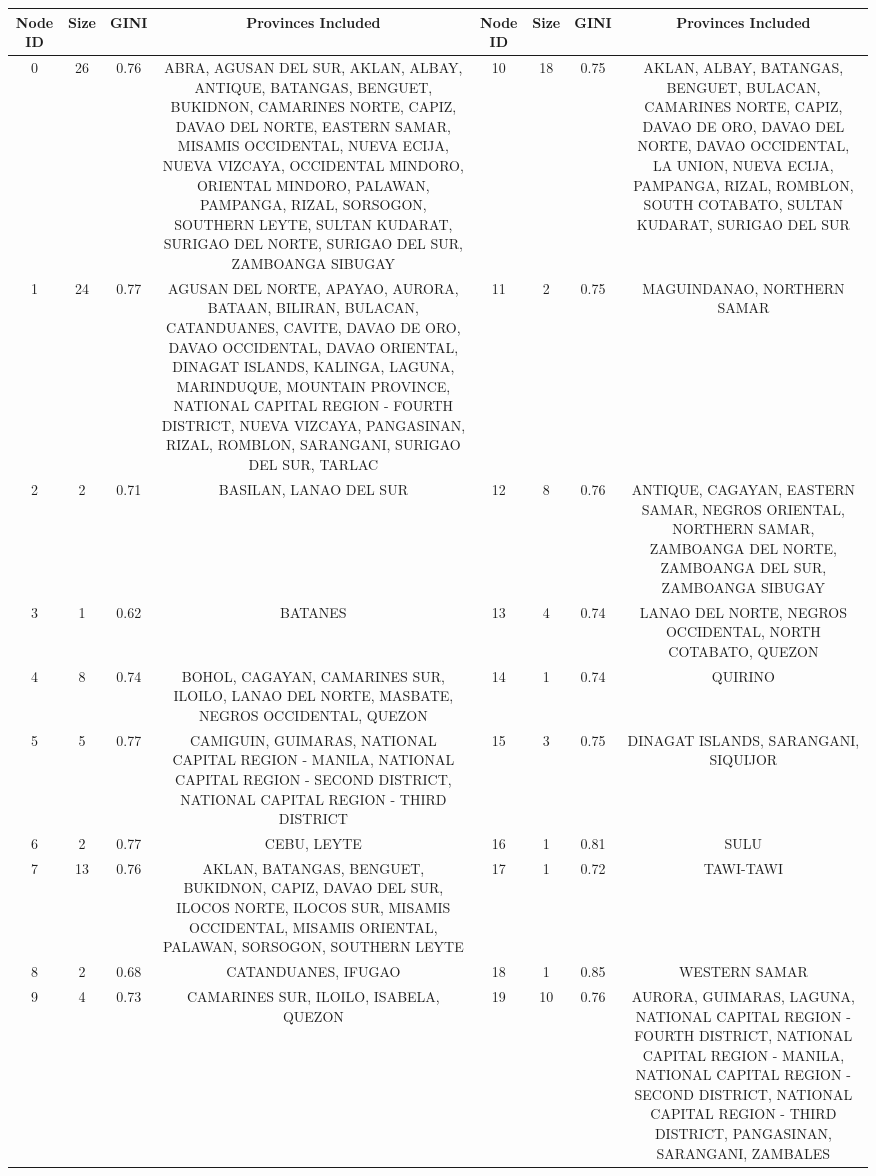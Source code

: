 \begin{tabular}{cccc|cccc}
\toprule
Node ID & Size & GINI & Provinces Included & Node ID & Size & GINI & Provinces Included \\
\midrule
0 & 26 & 0.76 & ABRA, AGUSAN DEL SUR, AKLAN, ALBAY, ANTIQUE, BATANGAS, BENGUET, BUKIDNON, CAMARINES NORTE, CAPIZ, DAVAO DEL NORTE, EASTERN SAMAR, MISAMIS OCCIDENTAL, NUEVA ECIJA, NUEVA VIZCAYA, OCCIDENTAL MINDORO, ORIENTAL MINDORO, PALAWAN, PAMPANGA, RIZAL, SORSOGON, SOUTHERN LEYTE, SULTAN KUDARAT, SURIGAO DEL NORTE, SURIGAO DEL SUR, ZAMBOANGA SIBUGAY & 10 & 18 & 0.75 & AKLAN, ALBAY, BATANGAS, BENGUET, BULACAN, CAMARINES NORTE, CAPIZ, DAVAO DE ORO, DAVAO DEL NORTE, DAVAO OCCIDENTAL, LA UNION, NUEVA ECIJA, PAMPANGA, RIZAL, ROMBLON, SOUTH COTABATO, SULTAN KUDARAT, SURIGAO DEL SUR \\
1 & 24 & 0.77 & AGUSAN DEL NORTE, APAYAO, AURORA, BATAAN, BILIRAN, BULACAN, CATANDUANES, CAVITE, DAVAO DE ORO, DAVAO OCCIDENTAL, DAVAO ORIENTAL, DINAGAT ISLANDS, KALINGA, LAGUNA, MARINDUQUE, MOUNTAIN PROVINCE, NATIONAL CAPITAL REGION - FOURTH DISTRICT, NUEVA VIZCAYA, PANGASINAN, RIZAL, ROMBLON, SARANGANI, SURIGAO DEL SUR, TARLAC & 11 & 2 & 0.75 & MAGUINDANAO, NORTHERN SAMAR \\
2 & 2 & 0.71 & BASILAN, LANAO DEL SUR & 12 & 8 & 0.76 & ANTIQUE, CAGAYAN, EASTERN SAMAR, NEGROS ORIENTAL, NORTHERN SAMAR, ZAMBOANGA DEL NORTE, ZAMBOANGA DEL SUR, ZAMBOANGA SIBUGAY \\
3 & 1 & 0.62 & BATANES & 13 & 4 & 0.74 & LANAO DEL NORTE, NEGROS OCCIDENTAL, NORTH COTABATO, QUEZON \\
4 & 8 & 0.74 & BOHOL, CAGAYAN, CAMARINES SUR, ILOILO, LANAO DEL NORTE, MASBATE, NEGROS OCCIDENTAL, QUEZON & 14 & 1 & 0.74 & QUIRINO \\
5 & 5 & 0.77 & CAMIGUIN, GUIMARAS, NATIONAL CAPITAL REGION - MANILA, NATIONAL CAPITAL REGION - SECOND DISTRICT, NATIONAL CAPITAL REGION - THIRD DISTRICT & 15 & 3 & 0.75 & DINAGAT ISLANDS, SARANGANI, SIQUIJOR \\
6 & 2 & 0.77 & CEBU, LEYTE & 16 & 1 & 0.81 & SULU \\
7 & 13 & 0.76 & AKLAN, BATANGAS, BENGUET, BUKIDNON, CAPIZ, DAVAO DEL SUR, ILOCOS NORTE, ILOCOS SUR, MISAMIS OCCIDENTAL, MISAMIS ORIENTAL, PALAWAN, SORSOGON, SOUTHERN LEYTE & 17 & 1 & 0.72 & TAWI-TAWI \\
8 & 2 & 0.68 & CATANDUANES, IFUGAO & 18 & 1 & 0.85 & WESTERN SAMAR \\
9 & 4 & 0.73 & CAMARINES SUR, ILOILO, ISABELA, QUEZON & 19 & 10 & 0.76 & AURORA, GUIMARAS, LAGUNA, NATIONAL CAPITAL REGION - FOURTH DISTRICT, NATIONAL CAPITAL REGION - MANILA, NATIONAL CAPITAL REGION - SECOND DISTRICT, NATIONAL CAPITAL REGION - THIRD DISTRICT, PANGASINAN, SARANGANI, ZAMBALES \\
\bottomrule
\end{tabular}
